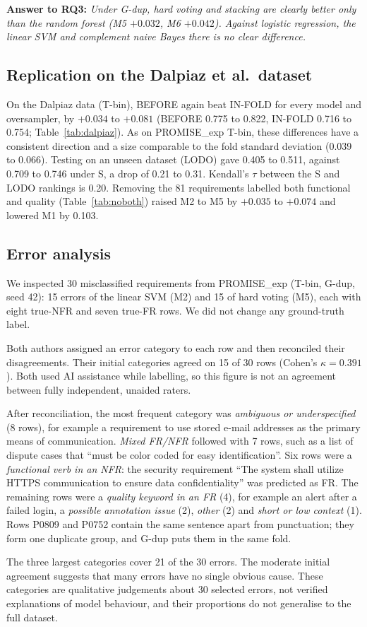 \textbf{Answer to RQ3:} \emph{Under G-dup, hard voting and stacking are clearly better only than the random forest (M5 $+0.032$, M6 $+0.042$). Against logistic regression, the linear SVM and complement naive Bayes there is no clear difference.}

\subsection{Replication on the Dalpiaz et al.\ dataset}


On the Dalpiaz data (T-bin), BEFORE again beat IN-FOLD for every model and oversampler, by $+0.034$ to $+0.081$ (BEFORE 0.775 to 0.822, IN-FOLD 0.716 to 0.754; Table~\ref{tab:dalpiaz}). As on PROMISE\_exp T-bin, these differences have a consistent direction and a size comparable to the fold standard deviation (0.039 to 0.066). Testing on an unseen dataset (LODO) gave 0.405 to 0.511, against 0.709 to 0.746 under S, a drop of 0.21 to 0.31. Kendall's $\tau$ between the S and LODO rankings is 0.20. Removing the 81 requirements labelled both functional and quality (Table~\ref{tab:noboth}) raised M2 to M5 by $+0.035$ to $+0.074$ and lowered M1 by 0.103.

\subsection{Error analysis}

We inspected 30 misclassified requirements from PROMISE\_exp (T-bin, G-dup, seed 42): 15 errors of the linear SVM (M2) and 15 of hard voting (M5), each with eight true-NFR and seven true-FR rows. We did not change any ground-truth label.

Both authors assigned an error category to each row and then reconciled their disagreements. Their initial categories agreed on 15 of 30 rows (Cohen's $\kappa = 0.391$). Both used AI assistance while labelling, so this figure is not an agreement between fully independent, unaided raters.

After reconciliation, the most frequent category was \emph{ambiguous or underspecified} (8 rows), for example a requirement to use stored e-mail addresses as the primary means of communication. \emph{Mixed FR/NFR} followed with 7 rows, such as a list of dispute cases that ``must be color coded for easy identification''. Six rows were a \emph{functional verb in an NFR}: the security requirement ``The system shall utilize HTTPS communication to ensure data confidentiality'' was predicted as FR. The remaining rows were a \emph{quality keyword in an FR} (4), for example an alert after a failed login, a \emph{possible annotation issue} (2), \emph{other} (2) and \emph{short or low context} (1). Rows P0809 and P0752 contain the same sentence apart from punctuation; they form one duplicate group, and G-dup puts them in the same fold.

The three largest categories cover 21 of the 30 errors. The moderate initial agreement suggests that many errors have no single obvious cause. These categories are qualitative judgements about 30 selected errors, not verified explanations of model behaviour, and their proportions do not generalise to the full dataset.

